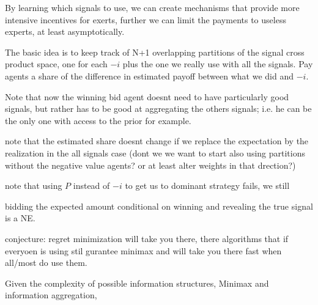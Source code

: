 By learning which signals to use, we can create mechanisms that provide more intensive incentives for exerts, further we can limit the payments to useless experts, at least asymptotically. 


The basic idea is to keep track of N+1 overlapping partitions of the signal cross product space, one for each $-i$ plus the one we really use with all the signals. Pay agents a share of the difference in estimated payoff between what we did and $-i$.

Note that now the winning bid agent doesnt need to have particularly good signals, but rather has to be good at aggregating the others signals; i.e. he can be the only one with access to the prior for example.


note that the estimated share doesnt change if we replace the expectation by the realization in the all signals case (dont we we want to start also using partitions without the negative value agents? or at least alter weights in that drection?)

note that using $P$ instead of $-i$ to get us to dominant strategy fails, we still 

bidding the expected amount conditional on winning and revealing the true signal is a NE.

conjecture: regret minimization will take you there, there algorithms that if everyoen is using stil gurantee minimax and will take you there fast when all/most do use them.

Given the complexity of possible information structures,
Minimax and information aggregation, 





